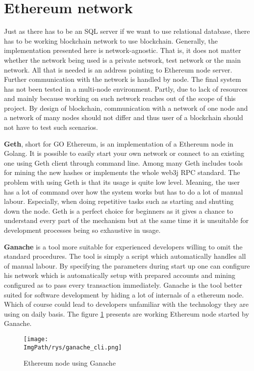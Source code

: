 \documentclass[a4paper,12pt,twoside,openany]{report}
\newcommand{\ImgPath}{.}
\begin{document}
\section{Ethereum network}

Just as there has to be an SQL server if we want to use relational database, there has to be working blockchain network to use blockchain. Generally, the implementation presented here is network-agnostic. That is, it does not matter whether the network being used is a private network, test network or the main network. All that is needed is an address pointing to Ethereum node server. Further communication with the network is handled by node. The final system has not been tested in a multi-node environment. Partly, due to lack of resources and mainly because working on such network reaches out of the scope of this project. By design of blockchain, communication with a network of one node and a network of many nodes should not differ and thus user of a blockchain should not have to test such scenarios.

\textbf{Geth}, short for GO Ethereum, is an implementation of a Ethereum node in Golang. It is possible to easily start your own network or connect to an existing one using Geth client through command line. Among many Geth includes tools for mining the new hashes or implements the whole web3j RPC standard.  The problem with using Geth is that its usage is quite low level. Meaning, the user has a lot of command over how the system works but has to do a lot of manual labour. Especially, when doing repetitive tasks such as starting and shutting down the node. Geth is a perfect choice for beginners as it gives a chance to understand every part of the mechanism but at the same time it is unsuitable for development processes being so exhaustive in usage.

\textbf{Ganache} is a tool more suitable for experienced developers willing to omit the standard procedures. The tool is simply a script which automatically handles all of manual labour. By specifying the parameters during start up one can configure his network which is automatically setup with prepared accounts and mining configured as to pass every transaction immediately. Ganache is the tool better suited for software development by hiding a lot of internals of a ethereum node. Which of course could lead to developers unfamiliar with the technology they are using on daily basis. The figure \ref{ganache} presents are working Ethereum node started by Ganache.

\begin{figure}[!htbp]
	\begin{center}
\centering
\texttt{[image: \\ImgPath/rys/ganache\_cli.png]}
\end{center}
	\caption{Ethereum node using Ganache}
	\label{ganache}
\end{figure}
\end{document}
